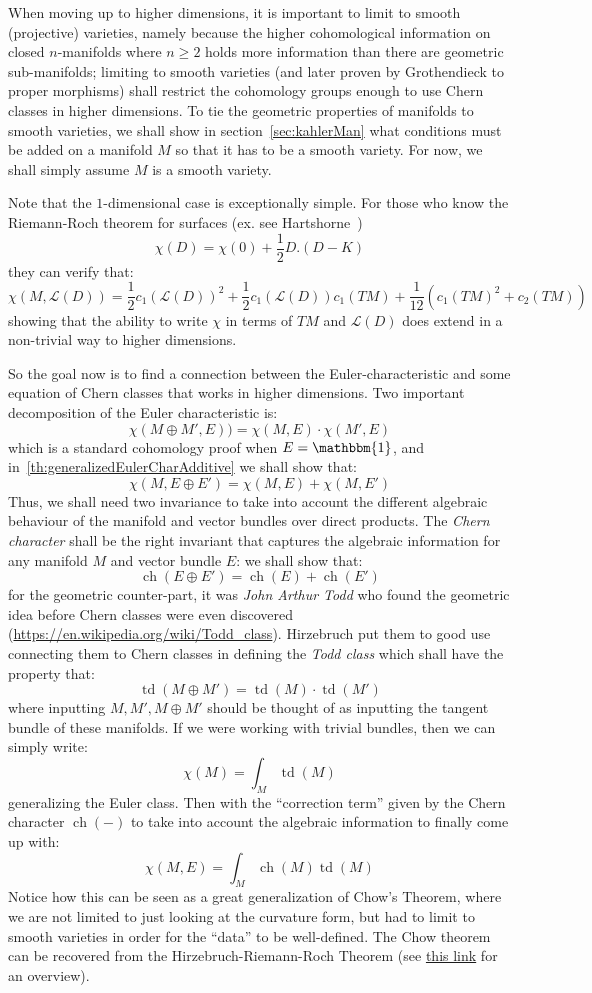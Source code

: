 \documentclass{ut-thesis}
\newcommand{\CL}{{\mathcal{L}}}
\newcommand{\ch}{{\operatorname{ch}}}
\newcommand{\td}{{\operatorname{td}}}
\renewcommand{\ch}{{\operatorname{ch}}}
\begin{document}
When moving up to higher dimensions, it is important to limit to smooth (projective) varieties, namely because the higher
cohomological information on closed $n$-manifolds where $n\ge 2$ holds more information than there are
geometric sub-manifolds; limiting to smooth varieties (and later proven by Grothendieck to proper
morphisms) shall restrict the cohomology groups enough to use Chern classes in higher dimensions. To tie the
geometric properties of manifolds to smooth varieties, we shall show in section~\ref{sec:kahlerMan} what
conditions must be added on a manifold $M$ so that it has to be a smooth variety. For now, we shall simply
assume $M$ is a smooth variety.

Note that the $1$-dimensional case is exceptionally simple. For those who know the Riemann-Roch theorem for
surfaces (ex. see Hartshorne~\cite[chapter~5.1, theorem~1.6]{hartshorneAlgebraicGeometry2013})
\[
\chi(D) = \chi(0) + \frac{1}{2}D.(D-K)
\]
they can verify that:
\[
  \chi(M, \CL(D)) =\frac{1}{2}c_1(\CL(D))^2 + \frac{1}{2}c_1(\CL(D))c_1(TM) + \frac{1}{12}(c_1(TM)^2 + c_2(TM))
\]
showing that the ability to write $\chi$ in terms of $TM$ and $\CL(D)$ does extend in a non-trivial way to higher
dimensions.

So the goal now is to find a connection between the Euler-characteristic and some equation of Chern classes
that works in higher dimensions. Two important decomposition of the Euler characteristic is:
\[
  \chi(M\oplus M', E)) = \chi(M, E)\cdot \chi(M', E)
\]
which is a standard cohomology proof when $E = \mathbbm{1}$, and in~\cref{th:generalizedEulerCharAdditive} we shall show that:
\[
  \chi(M, E\oplus E') = \chi(M, E) + \chi(M, E')
\]
Thus, we shall need two invariance to take into account the different algebraic behaviour of the manifold and
vector bundles over direct products. The \emph{Chern character} shall be the right invariant that captures the
algebraic information for any manifold $M$ and vector bundle $E$: we shall show that:
\[
  \ch(E\oplus E') = \ch(E) + \ch(E')
\]
for the geometric counter-part, it was \emph{John Arthur Todd} who found
the geometric idea before Chern classes were even discovered
(\url{https://en.wikipedia.org/wiki/Todd_class}). Hirzebruch put them to good use connecting
them to Chern classes in defining the \emph{Todd class} which shall have the property that:
\[
  \td(M\oplus M') = \td(M)\cdot \td(M')
\]
where inputting $M, M', M\oplus M'$ should be thought of as inputting the tangent bundle of these manifolds.
If we were working with trivial bundles, then we can simply write:
\[
  \chi(M) = \int_M \td(M)
\]
generalizing the Euler class. Then with the ``correction term'' given by the Chern character $\ch(-)$ to take
into account the algebraic information to finally come up with:
\[
  \chi(M,E) = \int_M \ch(M)\td(M)
\]
Notice how this can be seen as a great generalization of Chow's Theorem, where we are not limited to just
looking at the curvature form, but had to limit to smooth varieties in order for the ``data'' to be
well-defined. The Chow theorem can be recovered
from the Hirzebruch-Riemann-Roch Theorem (see \href{https://mathoverflow.net/questions/73450/top-chern-class-euler-characteristic}{this link} for an
overview).
\end{document}
